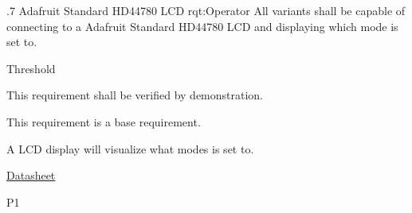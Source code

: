 \ONERQMTVKPP
{\RqtNumberBase.7}
{Adafruit Standard HD44780 LCD}
{rqt:Operator}
{All \ThisSys variants shall be capable of connecting to a Adafruit Standard HD44780 LCD and displaying which mode \ThisSys is set to.}
{
	\item [All Phases] Threshold
}
{This requirement shall be verified by demonstration.}
{
	\item [N/A] This requirement is a base requirement.
}
{
  \item A LCD display will visualize what modes \ThisSys is set to.
  \item \href{https://cdn-shop.adafruit.com/datasheets/HD44780.pdf}{Datasheet}
}
{P1}


